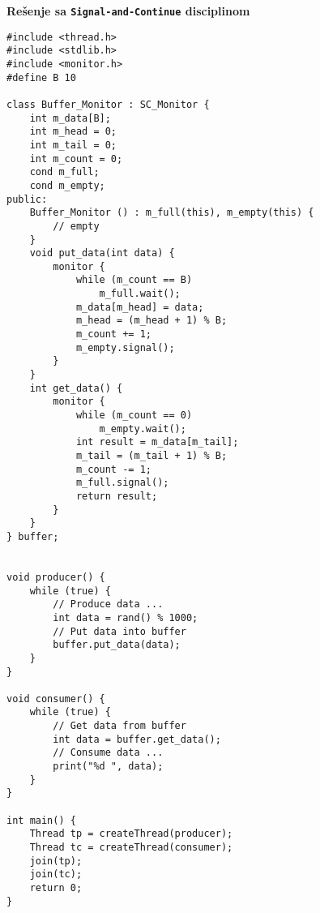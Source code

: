 \textbf{Re\v{s}enje sa \texttt{Signal-and-Continue} disciplinom}
\begin{lstlisting}
#include <thread.h>
#include <stdlib.h>
#include <monitor.h>
#define B 10

class Buffer_Monitor : SC_Monitor {
    int m_data[B];
    int m_head = 0;
    int m_tail = 0;
    int m_count = 0;
    cond m_full;
    cond m_empty;
public:
    Buffer_Monitor () : m_full(this), m_empty(this) {
        // empty
    }
    void put_data(int data) {
        monitor {
            while (m_count == B)
                m_full.wait();
            m_data[m_head] = data;
            m_head = (m_head + 1) % B;
            m_count += 1;
            m_empty.signal();
        }
    }
    int get_data() {
        monitor {
            while (m_count == 0)
                m_empty.wait();
            int result = m_data[m_tail];
            m_tail = (m_tail + 1) % B;
            m_count -= 1;
            m_full.signal();
            return result;
        }
    }
} buffer;


void producer() {
    while (true) {
        // Produce data ...
        int data = rand() % 1000;
        // Put data into buffer
        buffer.put_data(data);
    }
}

void consumer() {
    while (true) {
        // Get data from buffer
        int data = buffer.get_data();
        // Consume data ...
        print("%d ", data);
    }
}

int main() {
    Thread tp = createThread(producer);
    Thread tc = createThread(consumer);
    join(tp);
    join(tc);
    return 0;
}

\end{lstlisting}
